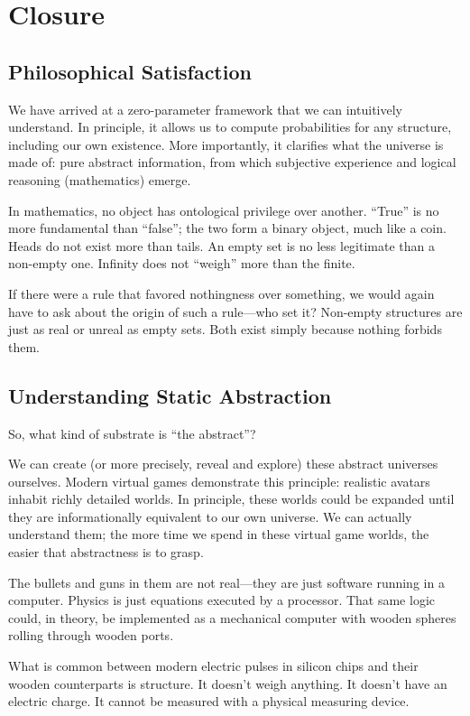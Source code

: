 \chapter{Closure}

\section{Philosophical Satisfaction}

We have arrived at a zero-parameter framework that we can intuitively understand.
In principle, it allows us to compute probabilities for any structure, including our own existence.
More importantly, it clarifies what the universe is made of: pure abstract information, from which subjective experience and logical reasoning (mathematics) emerge.

In mathematics, no object has ontological privilege over another.
``True'' is no more fundamental than ``false''; the two form a binary object, much like a coin.
Heads do not exist more than tails.
An empty set is no less legitimate than a non-empty one.
Infinity does not ``weigh'' more than the finite.

If there were a rule that favored nothingness over something, we would again have to ask about the origin of such a rule---who set it? Non-empty structures are just as real or unreal as empty sets.
Both exist simply because nothing forbids them.


\section{Understanding Static Abstraction}

So, what kind of substrate is ``the abstract''?

We can create (or more precisely, reveal and explore) these abstract universes ourselves.
Modern virtual games demonstrate this principle: realistic avatars inhabit richly detailed worlds.
In principle, these worlds could be expanded until they are informationally equivalent to our own universe.
We can actually understand them; the more time we spend in these virtual game worlds, the easier that abstractness is to grasp. 

The bullets and guns in them are not real---they are just software running in a computer.
Physics is just equations executed by a processor.
That same logic could, in theory, be implemented as a mechanical computer with wooden spheres rolling through wooden ports.

What is common between modern electric pulses in silicon chips and their wooden counterparts is structure.
It doesn't weigh anything.
It doesn't have an electric charge.
It cannot be measured with a physical measuring device.

